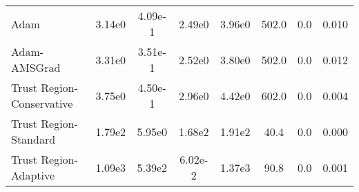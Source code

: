 \documentclass{article}
\begin{document}
\begin{table}[htbp]
{\begin{tabular}{l*{7}{S[table-format=2.2e-1]}}
Adam & 3.14e0 & 4.09e-1 & 2.49e0 & 3.96e0 & 502.0 & 0.0 & 0.010 \\
Adam-AMSGrad & 3.31e0 & 3.51e-1 & 2.52e0 & 3.80e0 & 502.0 & 0.0 & 0.012 \\
Trust Region-Conservative & 3.75e0 & 4.50e-1 & 2.96e0 & 4.42e0 & 602.0 & 0.0 & 0.004 \\
Trust Region-Standard & 1.79e2 & 5.95e0 & 1.68e2 & 1.91e2 & 40.4 & 0.0 & 0.000 \\
Trust Region-Adaptive & 1.09e3 & 5.39e2 & 6.02e-2 & 1.37e3 & 90.8 & 0.0 & 0.001 \\
\bottomrule
\end{tabular}
}
\end{table}
\end{document}
